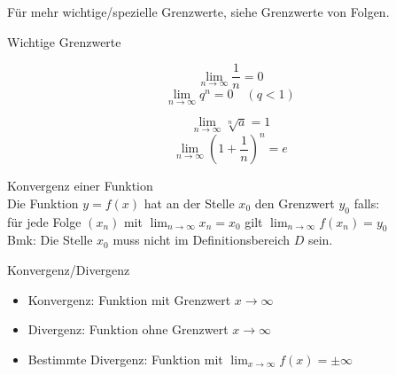 \noindent Für mehr wichtige/spezielle Grenzwerte, siehe Grenzwerte von Folgen.
\begin{highlight}{Wichtige Grenzwerte}
    \begin{center}
        \begin{minipage}{0.4\linewidth}
                $$\lim _{n \rightarrow \infty} \frac{1}{n}=0$$
                $$\lim _{n \rightarrow \infty} q^n=0 \quad(q<1)$$
        \end{minipage}
        \hfill\vline\hfill
        \begin{minipage}{0.5\linewidth}
            $$\lim _{n \rightarrow \infty} \sqrt[n]{a}=1$$
            $$\lim _{n \rightarrow \infty}\left(1+\frac{1}{n}\right)^n=e$$
        \end{minipage}
    \end{center}
\end{highlight}

\begin{definition}{Konvergenz einer Funktion}\\
    Die Funktion $y = f(x)$ hat an der Stelle $x_0$ den Grenzwert $y_0$ falls:\\
    für jede Folge $\left(x_{n}\right)$ mit $\lim _{n \rightarrow \infty} x_{n}=x_{0}$ gilt $\lim _{n \rightarrow \infty} f\left(x_{n}\right)=y_{0}$\\
    Bmk: Die Stelle $x_{0}$ muss nicht im Definitionsbereich $D$ sein.
\end{definition}

\begin{definition}{Konvergenz/Divergenz}
    \begin{itemize}
  \item Konvergenz:
  Funktion mit Grenzwert $x \rightarrow \infty$
  \item Divergenz:
  Funktion ohne Grenzwert $x \rightarrow \infty$
  \item Bestimmte Divergenz:
  Funktion mit $\lim _{x \rightarrow \infty} f(x)= \pm \infty$
\end{itemize}
\end{definition}

